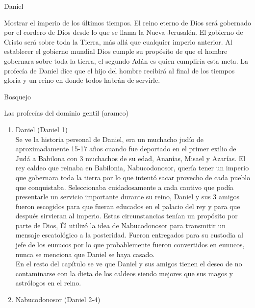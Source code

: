 \begin{section}{Daniel}
\begin{itemize}
		Mostrar el imperio de los últimos tiempos. El reino eterno de Dios será gobernado por el cordero de Dios desde lo que se llama la Nueva Jerusalén. El gobierno de Cristo será sobre toda la Tierra, más allá que cualquier imperio anterior. Al establecer el gobierno mundial Dios cumple su propósito de que el hombre gobernara sobre toda la tierra, el segundo Adán es quien cumpliría esta meta. La profecía de Daniel dice que el hijo del hombre recibirá al final de los tiempos gloria y un reino en donde todos habrán de servirle.
	\end{itemize}
	\begin{subsection}{Bosquejo}
		\begin{subsubsection}{Las profecías del dominio gentil (arameo)}
			\newpage
			\begin{enumerate}
				\item Daniel (Daniel 1)\\
					Se ve la historia personal de Daniel, era un muchacho judío de aproximadamente 15-17 años cuando fue deportado en el primer exilio de Judá a Babilona con 3 muchachos de su edad, Ananías, Misael y Azarías. El rey caldeo que reinaba en Babilonia, Nabucodonosor, quería tener un imperio que gobernara toda la tierra por lo que intentó sacar provecho de cada pueblo que conquistaba. Seleccionaba cuidadosamente a cada cautivo que podía presentarle un servicio importante durante su reino, Daniel y sus 3 amigos fueron escogidos para que fueran educados en el palacio del rey y para que después sirvieran al imperio. Estas circunstancias tenían un propósito por parte de Dios, Él utilizó la idea de Nabucodonosor para transmitir un mensaje escatológico a la posteridad. Fueron entregados para su custodia al jefe de los eunucos por lo que probablemente fueron convertidos en eunucos, nunca se menciona que Daniel se haya casado.\\
					En el resto del capítulo se ve que Daniel y sus amigos tienen el deseo de no contaminarse con la dieta de los caldeos siendo mejores que sus magos y astrólogos en el reino. 
				\item Nabucodonosor (Daniel 2-4)\\

\end{enumerate}
\end{subsubsection}
\end{subsection}
\end{section}
